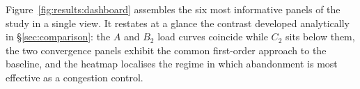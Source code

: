 Figure~\ref{fig:results:dashboard} assembles the six most informative panels of the study in
a single view. It restates at a glance the contrast developed analytically in
\S\ref{sec:comparison}: the $A$ and $B_2$ load curves coincide while $C_2$ sits below them,
the two convergence panels exhibit the common first-order approach to the baseline, and the
heatmap localises the regime in which abandonment is most effective as a congestion control.
